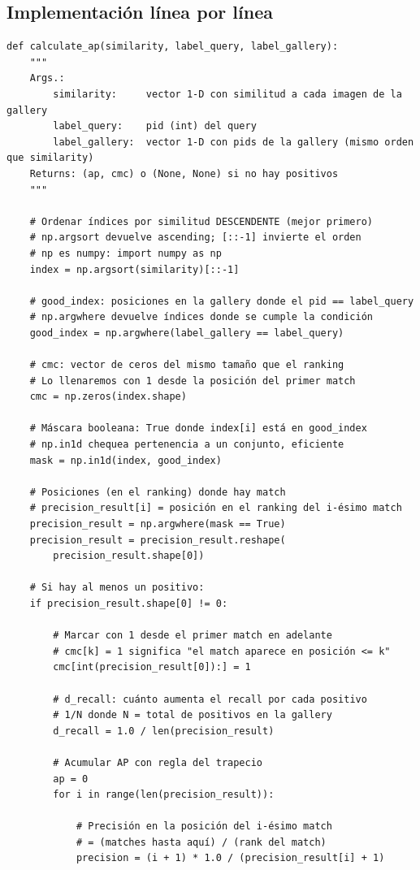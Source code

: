 \subsection*{Implementación línea por línea}

\begin{verbatim}
def calculate_ap(similarity, label_query, label_gallery):
    """
    Args.:
        similarity:     vector 1-D con similitud a cada imagen de la gallery
        label_query:    pid (int) del query
        label_gallery:  vector 1-D con pids de la gallery (mismo orden que similarity)
    Returns: (ap, cmc) o (None, None) si no hay positivos
    """

    # Ordenar índices por similitud DESCENDENTE (mejor primero)
    # np.argsort devuelve ascending; [::-1] invierte el orden
    # np es numpy: import numpy as np
    index = np.argsort(similarity)[::-1]

    # good_index: posiciones en la gallery donde el pid == label_query
    # np.argwhere devuelve índices donde se cumple la condición
    good_index = np.argwhere(label_gallery == label_query)

    # cmc: vector de ceros del mismo tamaño que el ranking
    # Lo llenaremos con 1 desde la posición del primer match
    cmc = np.zeros(index.shape)

    # Máscara booleana: True donde index[i] está en good_index
    # np.in1d chequea pertenencia a un conjunto, eficiente
    mask = np.in1d(index, good_index)

    # Posiciones (en el ranking) donde hay match
    # precision_result[i] = posición en el ranking del i-ésimo match
    precision_result = np.argwhere(mask == True)
    precision_result = precision_result.reshape(
        precision_result.shape[0])

    # Si hay al menos un positivo:
    if precision_result.shape[0] != 0:

        # Marcar con 1 desde el primer match en adelante
        # cmc[k] = 1 significa "el match aparece en posición <= k"
        cmc[int(precision_result[0]):] = 1

        # d_recall: cuánto aumenta el recall por cada positivo
        # 1/N donde N = total de positivos en la gallery
        d_recall = 1.0 / len(precision_result)

        # Acumular AP con regla del trapecio
        ap = 0
        for i in range(len(precision_result)):

            # Precisión en la posición del i-ésimo match
            # = (matches hasta aquí) / (rank del match)
            precision = (i + 1) * 1.0 / (precision_result[i] + 1)


\end{verbatim}
